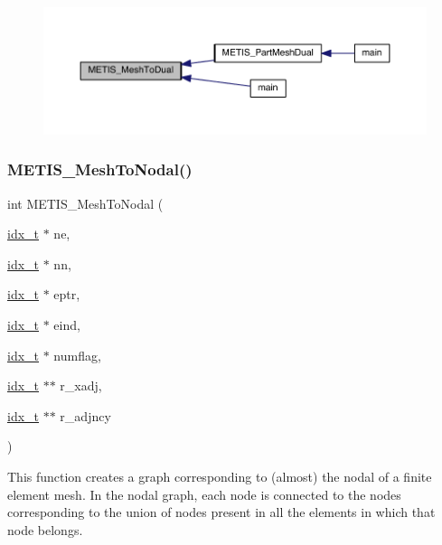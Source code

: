 \begin{figure}[H]
\begin{center}
\leavevmode
\includegraphics[width=350pt]{a00927_a2cf4672355fcfed039c04a2d1d134136_icgraph}
\end{center}
\end{figure}
\mbox{\label{a00927_ae9390485cd2d3654742f779a7188c125}} 
\subsubsection{\texorpdfstring{M\+E\+T\+I\+S\+\_\+\+Mesh\+To\+Nodal()}{METIS\_MeshToNodal()}}
{\footnotesize\ttfamily int M\+E\+T\+I\+S\+\_\+\+Mesh\+To\+Nodal (\begin{DoxyParamCaption}\item[{\hyperlink{a00876_aaa5262be3e700770163401acb0150f52}{idx\+\_\+t} $\ast$}]{ne,  }\item[{\hyperlink{a00876_aaa5262be3e700770163401acb0150f52}{idx\+\_\+t} $\ast$}]{nn,  }\item[{\hyperlink{a00876_aaa5262be3e700770163401acb0150f52}{idx\+\_\+t} $\ast$}]{eptr,  }\item[{\hyperlink{a00876_aaa5262be3e700770163401acb0150f52}{idx\+\_\+t} $\ast$}]{eind,  }\item[{\hyperlink{a00876_aaa5262be3e700770163401acb0150f52}{idx\+\_\+t} $\ast$}]{numflag,  }\item[{\hyperlink{a00876_aaa5262be3e700770163401acb0150f52}{idx\+\_\+t} $\ast$$\ast$}]{r\+\_\+xadj,  }\item[{\hyperlink{a00876_aaa5262be3e700770163401acb0150f52}{idx\+\_\+t} $\ast$$\ast$}]{r\+\_\+adjncy }\end{DoxyParamCaption})}

This function creates a graph corresponding to (almost) the nodal of a finite element mesh. In the nodal graph, each node is connected to the nodes corresponding to the union of nodes present in all the elements in which that node belongs.


